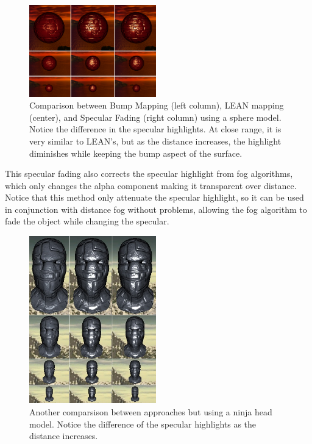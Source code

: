 \documentclass[10pt, conference]{IEEEtran}
\begin{document}
\begin{figure}[!h]
	\includegraphics[width=0.49\textwidth]{figs/sphere.png}
	\caption{Comparison between Bump Mapping (left column), LEAN mapping (center), and Specular Fading (right column) using a sphere model. Notice the difference in the specular highlights. At close range, it is very similar to LEAN's, but as the distance increases, the highlight diminishes while keeping the bump aspect of the surface.}
	\label{fig:sphere}
\end{figure}
This specular fading also corrects the specular highlight from fog algorithms, which only changes the alpha component making it transparent over distance. Notice that this method only attenuate the specular highlight, so it can be used in conjunction with distance fog without problems, allowing the fog algorithm to fade the object while changing the specular.
\begin{figure}[h]
	\includegraphics[width=0.49\textwidth]{figs/ninja.png}
	\caption{Another comparsison between approaches but using a ninja head model. Notice the difference of the specular highlights as the distance increases.}
	\label{fig:ninja}
\end{figure}
\end{document}
